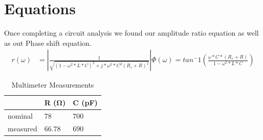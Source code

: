 \documentclass[10pt,twocolumn]{article}
\begin{document}
\section{Equations}

Once completing a circuit analysis we found our amplitude ratio equation as well as out Phase shift equation.
\begin{align*}
	
	 r(\omega) &= |\frac{1}{\sqrt{\left(1 - \omega^2*L*C\right)^2 + j*\omega^2*C^2\left(R_{s}+R\right)^2}}|
	 
	 \Phi(\omega) = tan^-1(\frac{\omega*C*\left(R_{s}+R\right)}{1-\omega^2*L*C})
\end{align*}

\begin{table}[bt]
	\begin{tabularx}{1\linewidth}{ lXX }
		\hline
		 & \textbf{R (Ω)} & \textbf{C (pF)} \\
		\hline
		nominal & $78$ & $700$ \\
		measured & $66.78$ & $690$ \\
		\hline
	\end{tabularx}
	\caption{Multimeter Measurements}
	\label{tab:Tab1}
\end{table}
\end{document}
